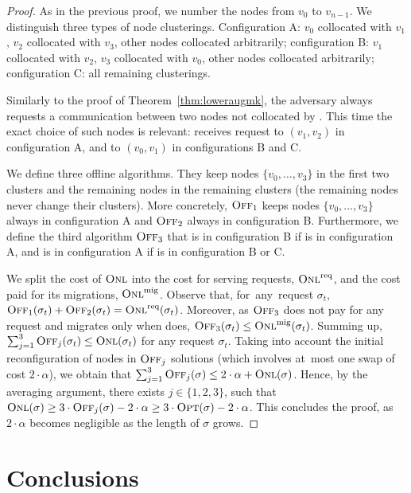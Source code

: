 \begin{proof} As in the previous proof, we number the nodes from $v_0$ to
$v_{n-1}$. We distinguish three types of node clusterings. Configuration A:
$v_0$ collocated with $v_1$, $v_2$ collocated with $v_3$, other nodes
collocated arbitrarily; configuration B: $v_1$ collocated with $v_2$, $v_3$
collocated with $v_0$, other nodes collocated arbitrarily; configuration C:
all remaining clusterings.

Similarly to the proof of Theorem~\ref{thm:loweraugmk}, the adversary always
requests a communication between two nodes not collocated by \ONL.
This time the exact choice of such nodes is relevant: \ONL receives request to
$(v_1,v_2)$ in configuration A, and to $(v_0,v_1)$ in configurations B and C.

We define three offline algorithms. They keep nodes
$\{v_0,\ldots,v_3\}$ in the first two clusters and the remaining nodes in the
remaining clusters (the remaining nodes never change their clusters). 
More concretely, $\textsc{Off}_1$ keeps nodes $\{v_0,\ldots,v_3\}$ always in
configuration A and $\textsc{Off}_2$ always in configuration B. Furthermore, we define
the third algorithm $\textsc{Off}_3$ that is in configuration B if \ONL is in
configuration A, and is in configuration A if \ONL is in configuration B or C.

We split the cost of $\textsc{Onl}$ into the cost for serving requests, $\textsc{Onl}^\textnormal{req}$, and
the cost paid for its migrations, $\textsc{Onl}^\textnormal{mig}$. Observe that, for~any~request
$\sigma_t$, $\textsc{Off}_1(\sigma_t) + \textsc{Off}_2(\sigma_t) = \textsc{Onl}^\textnormal{req}(\sigma_t)$.
Moreover, as $\textsc{Off}_3$ does not pay for any request and migrates only when 
\ONL does, $\textsc{Off}_3(\sigma_t) \leq \textsc{Onl}^\textnormal{mig}(\sigma_t)$. Summing up,
$\sum_{j=1}^3 \textsc{Off}_j(\sigma_t) \leq \textsc{Onl}(\sigma_t)$ for any request $\sigma_t$.
Taking into account the initial reconfiguration of nodes in $\textsc{Off}_j$ solutions
(which involves at~most one swap of cost $2 \cdot \alpha$), we obtain that
$\sum_{j=1}^3 \textsc{Off}_j(\sigma) \leq 2 \cdot \alpha + \textsc{Onl}(\sigma)$. Hence, by the
averaging argument, there exists $j \in \{1,2,3\}$, such that $\textsc{Onl}(\sigma)
\geq 3 \cdot \textsc{Off}_j(\sigma) - 2 \cdot \alpha \geq 3 \cdot \textsc{Opt}(\sigma) - 
2 \cdot \alpha$. This concludes the proof, as $2 \cdot \alpha$ becomes
negligible as the length of $\sigma$ grows.
\end{proof}



\section{Conclusions}\label{sec:conclusion-dynamic}

